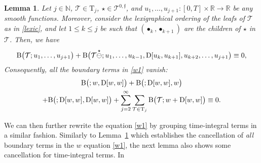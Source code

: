 \documentclass[%
11pt,  reqno]{amsart}
\makeatletter
\newcommand{\5}{\textup{V}}
\newtheorem{lemma}[theorem]{Lemma}
\theoremstyle{remark}
\newcommand{\R}{\mathbb{R}}
\newcommand{\bul}{\bullet}
\newcommand{\TT}{\mathcal{T}}
\newcommand{\Tr}{\mathrm{T}}
\newcommand{\ff}{\mathfrak{f}}
\newcommand{\N}{\mathbb{N}}
\def\<#1>{\csname MH@symb@#1\endcsname}
\newcommand{\B}{\mathcal{B}}
\numberwithin{equation}{section}
\numberwithin{theorem}{section}
\newcommand{\BB}{\mathrm{B}}
\newcommand{\D}{\mathrm{D}}
\makeatother
\begin{document}
\begin{lemma}
\label{LEM:wbd}
Let $j\in\N$, $\TT\in \Tr_j$, 
$\star \in \TT^{0,\ff}$, and $u_1, \ldots, u_{j+1}: [0,T]\times \R \to \R$ be any smooth functions. Moreover, consider the lexigraphical ordering of the leafs of $\TT$ as in \eqref{lexic}, 
and let $1 \le k \le j$ be such that $(\bul_k, \bul_{k+1})$ are the children of $\star$ in $\TT$. 
Then, we have 
\begin{align}
\label{wbd0}
\BB\big(\TT ; u_1, \ldots, u_{j+1} \big) 
+ \BB\big(\TT\overset{\star}{\ominus} \<1>; u_1,  \ldots, u_{k-1} , \D[u_k,u_{k+1}] , u_{k+2}, \ldots,  u_{j+1} \big) 
\equiv 0
,
\end{align}
Consequently, all the boundary terms in \eqref{w1} vanish:
\begin{multline}
\label{wbd1}
  \BB \big(\<1>; w, \D[w, w] \big) 
+ \BB\big(\<1>; \D[w, w],w\big) 
\\
+
\BB\big(\<1>;\D[w, w], \D[w, w]\big)
+ \sum_{j=2}^\infty \sum_{\TT\in \Tr_j}  \BB\big(\TT; w + \D[w, w]\big)  \equiv 0  .
\end{multline}


\end{lemma}

We can then further rewrite the equation \eqref{w1} by grouping time-integral terms in a similar fashion. Similarly to Lemma~\ref{LEM:wbd} which establishes the cancellation of \textit{all} boundary terms in the $w$ equation \eqref{w1}, the next lemma also shows some cancellation for time-integral terms. In 
\end{document}
